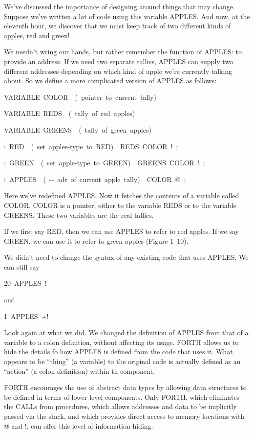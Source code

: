 We've discussed the importance of designing around things that may
change. Suppose we've written a lot of code using this variable APPLES.
And now, at the eleventh hour, we discover that we must keep track
of two different kinds of apples, red and green!

We needn't wring our hands, but rather remember the function of APPLES:
to provide an address. If we need two separate tallies, APPLES can
supply two different addresses depending on which kind of apple we're
currently talking about. So we define a more complicated version of
APPLES as follows:

\begin{lyxcode}
VARIABLE~COLOR~~(~pointer~to~current~tally)

VARIABLE~REDS~~(~tally~of~red~apples)

VARIABLE~GREENS~~(~tally~of~green~apples)

:~RED~~(~set~apples-type~to~RED)~~REDS~COLOR~!~;

:~GREEN~~(~set~apple-type~to~GREEN)~~GREENS~COLOR~!~;

:~APPLES~~(~-{}-~adr~of~current~apple~tally)~~COLOR~@~;
\end{lyxcode}
Here we've redefined APPLES. Now it fetches the contents of a variable
called COLOR. COLOR is a pointer, either to the variable REDS or to
the variable GREENS. These two variables are the real tallies.

If we first say RED, then we can use APPLES to refer to red apples.
If we say GREEN, we can use it to refer to green apples (Figure 1--10).

We didn't need to change the syntax of any existing code that uses
APPLES. We can still say

\begin{lyxcode}
20~APPLES~!
\end{lyxcode}
and

\begin{lyxcode}
1~APPLES~+!
\end{lyxcode}
Look again at what we did. We changed the definition of APPLES from
that of a variable to a colon definition, without affecting its usage.
FORTH allows us to hide the details fo how APPLES is defined from
the code that uses it. What appears to be {}``thing'' (a variable)
to the original code is actually defined as an {}``action'' (a colon
definition) within th component.

FORTH encourages the use of abstract data types by allowing data structures
to be defined in terms of lower level components. Only FORTH, which
eliminates the CALLs from procedures, which allows addresses and data
to be implicitly passed via the stack, and which provides direct access
to memory locations with @ and !, can offer this level of information-hiding.

